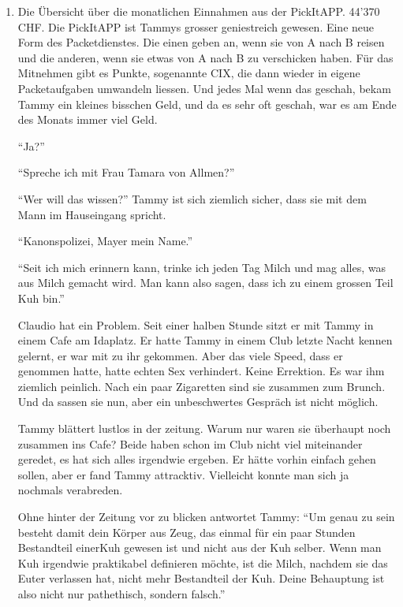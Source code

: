 \begin{enumerate}
\item Die Übersicht über die monatlichen Einnahmen aus der PickItAPP. 44'370\,CHF. Die  PickItAPP ist Tammys grosser geniestreich gewesen. Eine neue Form des Packetdienstes. Die einen geben an, wenn sie von A nach B reisen und die anderen, wenn sie etwas von A nach B zu verschicken haben. Für das Mitnehmen gibt es Punkte, sogenannte CIX, die dann wieder in eigene Packetaufgaben umwandeln liessen. Und jedes Mal wenn das geschah, bekam Tammy ein kleines bisschen Geld, und da es sehr oft geschah, war es am Ende des Monats immer viel Geld. 


\enquote{Ja?}

\enquote{Spreche ich mit Frau Tamara von Allmen?}

\enquote{Wer will das wissen?} Tammy ist sich ziemlich sicher, dass sie mit dem Mann im Hauseingang spricht. 

\enquote{Kanonspolizei, Mayer mein Name.} 









\enquote{Seit ich mich erinnern kann, trinke ich jeden Tag Milch und mag alles, was aus Milch gemacht wird. Man kann also sagen, dass ich zu einem grossen Teil Kuh bin.} 

Claudio hat ein Problem. Seit einer halben Stunde sitzt er mit Tammy in einem Cafe am Idaplatz. Er hatte Tammy in einem Club letzte Nacht kennen gelernt, er war mit zu ihr gekommen. Aber das viele Speed, dass er genommen hatte, hatte echten Sex verhindert. Keine Errektion. Es war ihm ziemlich peinlich. Nach ein paar Zigaretten sind sie zusammen zum Brunch. Und da sassen sie nun, aber ein unbeschwertes Gespräch ist nicht möglich.

Tammy blättert lustlos in der zeitung. Warum nur waren sie überhaupt noch zusammen ins Cafe? Beide haben schon im Club nicht viel miteinander geredet, es hat sich alles irgendwie ergeben. Er hätte vorhin einfach gehen sollen, aber er fand Tammy attracktiv. Vielleicht konnte man sich ja nochmals verabreden.

Ohne hinter der Zeitung vor zu blicken antwortet Tammy: \enquote{Um genau zu sein besteht damit dein Körper aus Zeug, das einmal für ein paar Stunden Bestandteil einerKuh gewesen ist und nicht aus der Kuh selber. Wenn man Kuh irgendwie praktikabel definieren möchte, ist die Milch, nachdem sie das Euter verlassen hat, nicht mehr Bestandteil der Kuh. Deine Behauptung ist also nicht nur pathethisch, sondern falsch.}


\end{enumerate}
